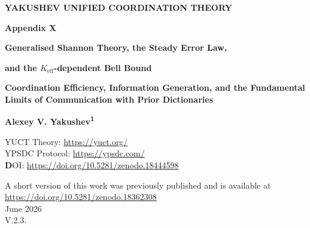\documentclass[12pt,a4paper]{article}
\theoremstyle{remark}
\begin{document}
	
	\begin{titlepage}
		\begin{center}
			\vspace*{1cm}
			
\Huge\textbf{YAKUSHEV UNIFIED COORDINATION THEORY}\par
\vspace{0.5cm}

{\Huge\bfseries Appendix X\par}
\vspace{0.5cm}
{\Large\bfseries Generalised Shannon Theory, the Steady Error Law,\par}
\vspace{0.2cm}
{\Large\bfseries and the \(K_{\mathrm{eff}}\)-dependent Bell Bound\par}

\vspace{0.5cm}
\Large\textbf{Coordination Efficiency, Information Generation, and the Fundamental Limits of Communication with Prior Dictionaries}
			
			\vspace{1.5cm}
			
			\Large\textbf{Alexey V. Yakushev\textsuperscript{1}}
			
			YUCT Theory: \url{https://yuct.org/}\\
			YPSDC Protocol: \url{https://ypsdc.com/}\\
			
			
			\vspace{2cm}
			\textbf DOI: \url{https://doi.org/10.5281/zenodo.18444598}\\
			
			\vspace{1cm}
			
			\vspace{0cm}
			\large 
			A short version of this work was previously published and is available at\\ \url{https://doi.org/10.5281/zenodo.18362308}\\
			\vspace{1cm}
			June 2026 \\ \large V.2.3.
			
			\vspace{2cm}
			

\end{center}
\end{titlepage}
\end{document}
